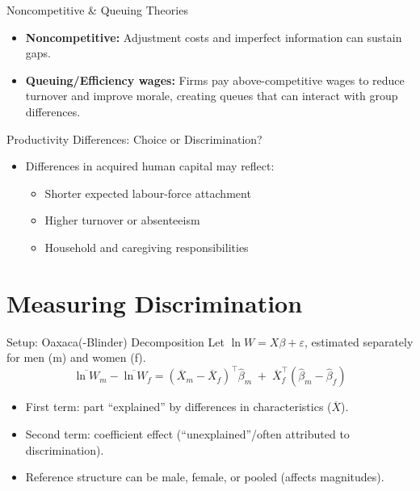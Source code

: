 \documentclass[aspectratio=169]{beamer}
\begin{document}
\begin{frame}{Noncompetitive \& Queuing Theories}
\transfade
\begin{itemize}[<+->]
  \item \textbf{Noncompetitive:} Adjustment costs and imperfect information can sustain gaps.
  \item \textbf{Queuing/Efficiency wages:} Firms pay above-competitive wages to reduce turnover and improve morale, creating queues that can interact with group differences.
\end{itemize}
\end{frame}

\begin{frame}{Productivity Differences: Choice or Discrimination?}
\transfade
\begin{itemize}[<+->]
  \item Differences in acquired human capital may reflect:
    \begin{itemize}[<+->]
      \item Shorter expected labour-force attachment
      \item Higher turnover or absenteeism
      \item Household and caregiving responsibilities
    \end{itemize}
\end{itemize}
\end{frame}

\section{Measuring Discrimination}

\begin{frame}{Setup: Oaxaca(-Blinder) Decomposition}
\transfade
\small
Let \( \ln W = X\beta + \varepsilon \), estimated separately for men (m) and women (f).
\[
\overline{\ln W}_m - \overline{\ln W}_f
= (\overline{X}_m - \overline{X}_f)^\top \hat{\beta}_m
\;+\; \overline{X}_f^{\top}(\hat{\beta}_m - \hat{\beta}_f)
\]
\begin{itemize}[<+->]
  \item First term: part “explained” by differences in characteristics (\(\overline{X}\)).
  \item Second term: \alert{coefficient effect} (“unexplained”/often attributed to discrimination).
  \item Reference structure can be male, female, or pooled (affects magnitudes).
\end{itemize}
\end{frame}
\end{document}
